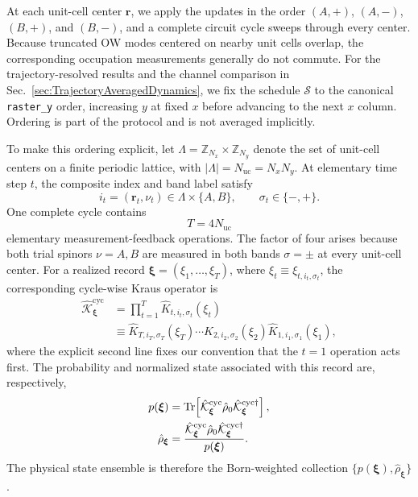 \documentclass[aps,prb,twocolumn,superscriptaddress,longbibliography,floatfix]{revtex4-2}
\newcommand{\mc}[1]{\mathcal{#1}}
\newcommand{\mr}[1]{\mathrm{#1}}
\newcommand{\bfr}{\boldsymbol r}
\theoremstyle{plain}
\theoremstyle{definition}
\theoremstyle{remark}
\begin{document}
At each unit-cell center $\bfr$, we apply the updates in the order $(A,+)$, $(A,-)$, $(B,+)$, and $(B,-)$, and a complete circuit cycle sweeps through every center. Because truncated OW modes centered on nearby unit cells overlap, the corresponding occupation measurements generally do not commute. For the trajectory-resolved results and the channel comparison in Sec.~\ref{sec:TrajectoryAveragedDynamics}, we fix the schedule $\mc S$ to the canonical \texttt{raster\_y} order, increasing $y$ at fixed $x$ before advancing to the next $x$ column. Ordering is part of the protocol and is not averaged implicitly.

To make this ordering explicit, let $\Lambda=\mathbb Z_{N_x}\times\mathbb Z_{N_y}$ denote the set of unit-cell centers on a finite periodic lattice, with $|\Lambda|=N_{\mr{uc}}=N_xN_y$. At elementary time step $t$, the composite index and band label satisfy
\begin{equation}
    i_t=(\bfr_t,\nu_t)\in\Lambda\times\{A,B\},
    \qquad \sigma_t\in\{-,+\}.
\end{equation}
One complete cycle contains
\begin{equation}
    T=4N_{\mr{uc}}
\end{equation}
elementary measurement-feedback operations. The factor of four arises because both trial spinors $\nu=A,B$ are measured in both bands $\sigma=\pm$ at every unit-cell center. For a realized record $\boldsymbol\xi=(\xi_1,\ldots,\xi_T)$, where $\xi_t\equiv\xi_{t,i_t,\sigma_t}$, the corresponding cycle-wise Kraus operator is
\begin{align}
    \hat{\mc{K}}^{\mr{cyc}}_{\boldsymbol\xi}
    &=\prod_{t=1}^{T}
    \hat K_{t,i_t,\sigma_t}(\xi_t)\nonumber\\
    &\equiv\hat K_{T,i_T,\sigma_T}(\xi_T)\cdots
    \hat K_{2,i_2,\sigma_2}(\xi_2)
    \hat K_{1,i_1,\sigma_1}(\xi_1),
    \label{eq:AdaptiveCycleKraus}
\end{align}
where the explicit second line fixes our convention that the $t=1$ operation acts first. The probability and normalized state associated with this record are, respectively,
\begin{align}
    p(\boldsymbol\xi)
    &=\Tr\!\left[\hat{\mc{K}}^{\mr{cyc}}_{\boldsymbol\xi}\hat\rho_0
    \hat{\mc{K}}_{\boldsymbol\xi}^{\mr{cyc}\dagger}\right],
    \label{eq:AdaptiveRecordProbability}\\
    \hat\rho_{\boldsymbol\xi}
    &=\frac{\hat{\mc{K}}^{\mr{cyc}}_{\boldsymbol\xi}\hat\rho_0
    \hat{\mc{K}}_{\boldsymbol\xi}^{\mr{cyc}\dagger}}
    {p(\boldsymbol\xi)}.
    \label{eq:AdaptiveConditionalState}
\end{align}
The physical state ensemble is therefore the Born-weighted collection $\{p(\boldsymbol\xi),\hat\rho_{\boldsymbol\xi}\}$.
\end{document}
